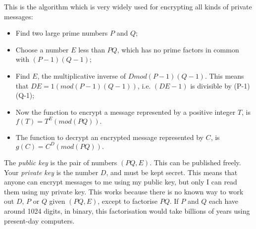 This is the algorithm which is very widely used for encrypting all kinds of
  private messages:
  \begin{itemize}
  \item Find two large prime numbers $P$ and $Q$;
  \item Choose a number $E$ less than $PQ$, which has no prime factors
  in common with $(P-1)(Q-1)$;
  \item Find $E$, the multiplicative inverse of $D mod
    (P-1)(Q-1)$. This means that $DE=1 (mod(P-1)(Q-1))$, i.e. $(DE-1)$
    is divisible by (P-1)(Q-1);
  \item Now the function to encrypt a message represented by a
    positive integer $T$, is $f(T)=T^{E}(mod(PQ)).$
  \item The function to decrypt an encrypted message represented by
  $C$, is $g(C)=C^{D}(mod(PQ)).$
  \end{itemize}
The \emph{public key} is the pair of numbers $(PQ, E)$. This can be published
freely.  Your \emph{private key} is the number $D$, and must be kept
secret. This means that anyone can encrypt messages to me using my
public key, but only I can read them using my private key.
This works because there is no known way to work out $D$, $P$ or $Q$ given
$(PQ, E)$, except to factorise $PQ$. If $P$ and $Q$ each have around 1024
digits, in binary, this factorisation would take billions of years
using present-day computers.